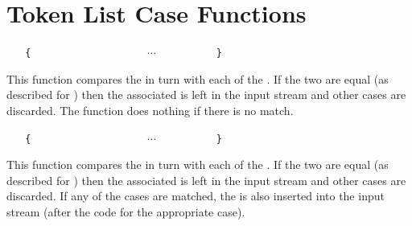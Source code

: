 \documentclass[oneside]{book}
\begin{document}
\section{Token List Case Functions}

\begin{function}{\TlVarCase}
\begin{syntax}
 
~ ~ \verb"{"
~ ~ ~ ~  
~ ~ ~ ~  
~ ~ ~ ~ $\cdots$
~ ~ ~ ~  
~ ~ \verb"}"
\end{syntax}
This function compares the  in turn
with each of the . If the two
are equal (as described for )
then the associated  is left in the input
stream and other cases are discarded. The function
does nothing if there is no match.
\begin{demohigh}
\IgnoreSpacesOn
\TlSet {}
\TlSet {}
\TlSet {}
\TlSet {}
\TlVarCase {}
\IgnoreSpacesOff
\end{demohigh}
\end{function}

\begin{function}{\TlVarCaseT}
\begin{syntax}
 
~ ~ \verb"{"
~ ~ ~ ~  
~ ~ ~ ~  
~ ~ ~ ~ $\cdots$
~ ~ ~ ~  
~ ~ \verb"}"
~ ~ 
\end{syntax}
This function compares the  in turn
with each of the . If the two
are equal (as described for )
then the associated  is left in the input
stream and other cases are discarded. If any of the
cases are matched, the  is also inserted into the
input stream (after the code for the appropriate case).
\begin{demohigh}
\IgnoreSpacesOn
\TlSet {}
\TlSet {}
\TlSet {}
\TlSet {}
\TlVarCaseT {}
\IgnoreSpacesOff
\end{demohigh}
\end{function}
\end{document}
